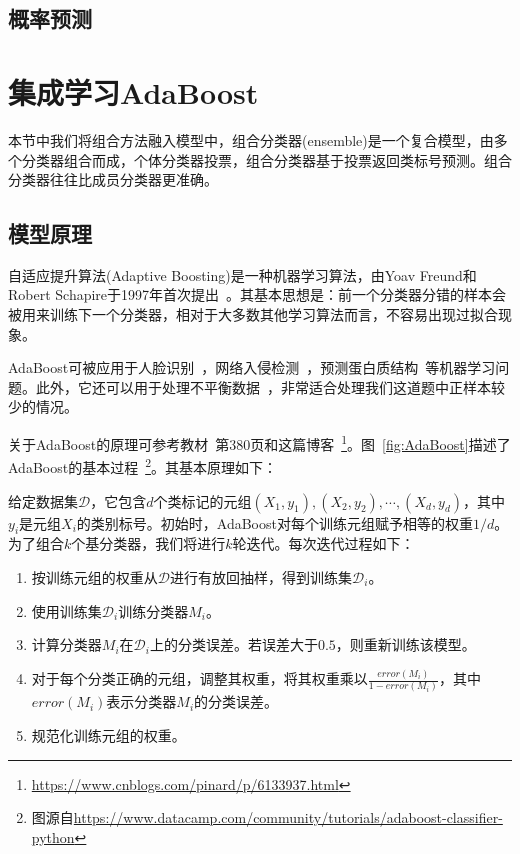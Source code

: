 \documentclass[12pt]{article} %
\newcommand\calD{\mathcal{D}}
\newcommand\XX{\boldsymbol{\mathit{X}}}
\begin{document}
\begin{sloppypar}
\subsection{概率预测}


\newpage
\section{集成学习AdaBoost}

本节中我们将组合方法融入模型中，组合分类器(ensemble)是一个复合模型，由多个分类器组合而成，个体分类器投票，组合分类器基于投票返回类标号预测。组合分类器往往比成员分类器更准确。

\subsection{模型原理}

自适应提升算法(Adaptive Boosting)是一种机器学习算法，由Yoav Freund和Robert Schapire于1997年首次提出~\cite{freund1997decision}。其基本思想是：前一个分类器分错的样本会被用来训练下一个分类器，相对于大多数其他学习算法而言，不容易出现过拟合现象。

AdaBoost可被应用于人脸识别~\cite{wu2004fast}，网络入侵检测~\cite{hu2008adaboost}，预测蛋白质结构~\cite{niu2006predicting}等机器学习问题。此外，它还可以用于处理不平衡数据~\cite{viola2002fast}，非常适合处理我们这道题中正样本较少的情况。

关于AdaBoost的原理可参考教材~\cite{han2011data}第380页和这篇博客~\footnote{\url{https://www.cnblogs.com/pinard/p/6133937.html}}。图~\ref{fig:AdaBoost}描述了AdaBoost的基本过程~\footnote{图源自\url{https://www.datacamp.com/community/tutorials/adaboost-classifier-python}}。其基本原理如下：

给定数据集$\calD$，它包含$d$个类标记的元组$(\XX_1, y_1), (\XX_2, y_2), \cdots, (\XX_d, y_d)$，其中$y_i$是元组$\XX_i$的类别标号。初始时，AdaBoost对每个训练元组赋予相等的权重$1/d$。为了组合$k$个基分类器，我们将进行$k$轮迭代。每次迭代过程如下：
\begin{enumerate}
\item 按训练元组的权重从$\calD$进行有放回抽样，得到训练集$\calD_i$。
\item 使用训练集$\calD_i$训练分类器$M_i$。
\item 计算分类器$M_i$在$\calD_i$上的分类误差。若误差大于$0.5$，则重新训练该模型。
\item 对于每个分类正确的元组，调整其权重，将其权重乘以$\frac{error(M_i)}{1 - error(M_i)}$，其中$error(M_i)$表示分类器$M_i$的分类误差。
\item 规范化训练元组的权重。
\end{enumerate}


\end{sloppypar}
\end{document}
